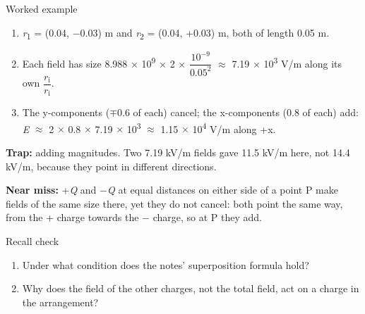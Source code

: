 \documentclass[11pt]{article}
\begin{document}
\begin{keepsection}
\begin{workedbox}{Worked example}
\begin{enumerate}
\item \textit{r}\textsubscript{1} = (0.04, \ensuremath{-}0.03) m and \textit{r}\textsubscript{2} = (0.04, +0.03) m, both of length 0.05 m.
\item Each field has size 8.988 \ensuremath{\times} 10\textsuperscript{9} \ensuremath{\times} 2 \ensuremath{\times} {\small\ensuremath{\dfrac{10^{-9}}{0.05^{2}}}} \ensuremath{\approx} 7.19 \ensuremath{\times} 10\textsuperscript{3} V/m along its own {\small\ensuremath{\dfrac{{r}_{\mathrm{i}}}{{r}_{\mathrm{i}}}}}.
\item The y-components (\ensuremath{\mp}0.6 of each) cancel; the x-components (0.8 of each) add: \textit{E} \ensuremath{\approx} 2 \ensuremath{\times} 0.8 \ensuremath{\times} 7.19 \ensuremath{\times} 10\textsuperscript{3} \ensuremath{\approx} 1.15 \ensuremath{\times} 10\textsuperscript{4} V/m along +x.
\end{enumerate}
\end{workedbox}

\begin{notebox}\textbf{Trap:} adding magnitudes. Two 7.19 kV/m fields gave 11.5 kV/m here, not 14.4 kV/m, because they point in different directions.\end{notebox}

\begin{notebox}\textbf{Near miss:} +\textit{Q} and \ensuremath{-}\textit{Q} at equal distances on either side of a point P make fields of the same size there, yet they do not cancel: both point the same way, from the + charge towards the \ensuremath{-} charge, so at P they add.\end{notebox}

\begin{recallbox}{Recall check}
\begin{enumerate}
\item Under what condition does the notes’ superposition formula hold?
\item Why does the field of the other charges, not the total field, act on a charge in the arrangement?
\end{enumerate}

\end{recallbox}
\end{keepsection}
\end{document}
